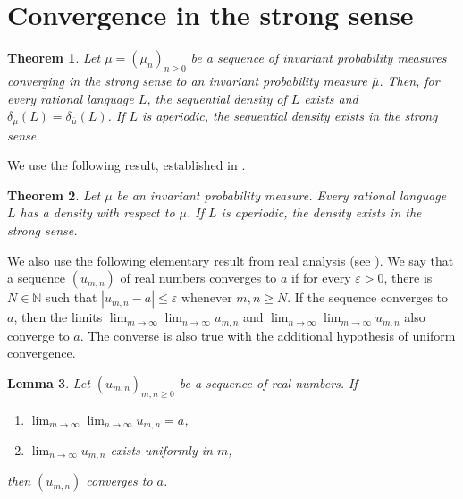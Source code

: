 \documentclass{article}[11pt]
\newtheorem{theorem}{Theorem}
\newtheorem{lemma}[theorem]{Lemma}
\newcommand{\N}{\mathbb{N}}
\numberwithin{theorem}{section}
\numberwithin{equation}{section}
\numberwithin{figure}{section}
\numberwithin{table}{section}
\begin{document}

\section{Convergence in the strong sense}\label{sectionStrong}

\begin{theorem}\label{theoremMain}
Let $\mu=(\mu_n)_{n\ge 0}$ be a sequence of invariant probability measures converging in the strong sense
to an invariant probability measure $\overline{\mu}$. Then, for every rational language $L$,
the sequential density of $L$ exists and 
$\delta_\mu(L)=\delta_{\overline{\mu}}(L)$. If $L$ is aperiodic, the sequential density exists in the strong sense.
\end{theorem}
We use the following result, established in \cite{BertheGouletOuelletPerrin2025}. 
\begin{theorem}\label{theoremBGOP}
Let $\mu$ be an invariant probability measure. Every rational language $L$ has a density
with respect to $\mu$. If $L$ is aperiodic, the density exists in the strong sense.
\end{theorem}
We also use the following elementary result from real analysis (see \cite[Section 8.20]{Apostol1974}).
We say that a sequence $(u_{m,n})$ of real numbers converges to $a$ if for every $\varepsilon>0$,
there is $N \in\N$ such that $|u_{m,n}-a|\le\varepsilon$ whenever $m,n\ge N$. 
If the sequence converges to $a$,
then the limits $\lim_{m\to\infty}\lim_{n\to\infty}u_{m,n}$ and $\lim_{n\to\infty}\lim_{m\to\infty}u_{m,n}$
also converge to $a$. 
The converse is also true with the additional hypothesis of uniform convergence.

\begin{lemma}\label{lemmaDoubleSequences}
Let $(u_{m,n})_{m,n\ge 0}$ be a sequence of real numbers. If
\begin{enumerate}
\item[\rm(i)] $\lim_{m\to\infty}\lim_{n\to\infty}u_{m,n}=a$,
\item[\rm(ii)] $\lim_{n\to\infty}u_{m,n}$ exists uniformly in $m$,
\end{enumerate}
then $(u_{m,n})$ converges to $a$.
\end{lemma}
\end{document}
